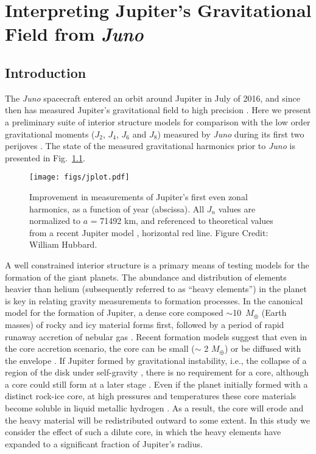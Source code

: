 \chapter{Interpreting Jupiter's Gravitational Field from \textit{Juno}}\label{chap8}

\section{Introduction} \label{sec:intro}

The \textit{Juno} spacecraft entered an orbit around Jupiter in July of 2016, and
since then has measured Jupiter's gravitational field to high precision
\citep{bolton2017}.  Here we present a preliminary suite of interior structure models
for comparison with the low order gravitational moments ($J_2$, $J_4$, $J_6$ and
$J_8$) measured by \textit{Juno} during its first two perijoves \citep{Folkner2017}.
The state of the measured gravitational harmonics prior to \textit{Juno} is presented
in Fig.~\ref{fig:jplot}.

\begin{figure}[h]
  \begin{center}
    \noindent\texttt{[image: figs/jplot.pdf]}
  \end{center}
\caption{Improvement in measurements of Jupiter's first even zonal harmonics, as a function of year
(abscissa).  All $J_n$ values are normalized to $a$ = 71492 km, and referenced to theoretical
values from a recent Jupiter model \citep{hubbard2016}, horizontal red line. Figure
Credit: William Hubbard. }
\label{fig:jplot}
\end{figure}

A well constrained interior structure is  a primary means of testing models for
the formation of the giant planets. The abundance and distribution of elements
heavier than helium  (subsequently referred to as ``heavy elements'') in the
planet is key in relating gravity measurements to formation processes. In the
canonical model for the formation of Jupiter, a dense core composed
$\sim$10~$M_\oplus$ (Earth masses) of rocky and icy material forms first,
followed by a period of rapid runaway accretion of nebular gas
\citep{Mizuno1978,Bodenheimer1986,Pollack1996}. Recent formation models suggest
that even in the core accretion scenario, the core can be small ($\sim$ 2
$M_\oplus$) or be diffused with the envelope
\citep{venturini2016,lozovsky2017}. If Jupiter formed by gravitational
instability, i.e., the collapse of a region of the disk under self-gravity
\citep{Boss1997}, there is no requirement for a core, although a core could
still form at a later stage \citep{helled2014}.  Even if the planet initially
formed with a distinct rock-ice core, at high pressures and temperatures these
core materials become soluble in liquid metallic hydrogen
\citep{Stevenson1985,Wilson2012a,wilson12b,Wahl2013,Gonzalez2013}. As a
result, the core will erode and the heavy material will be redistributed
outward to some extent. In this study we consider the effect of such a dilute
core, in which the heavy elements have expanded to a significant fraction of
Jupiter's radius.




